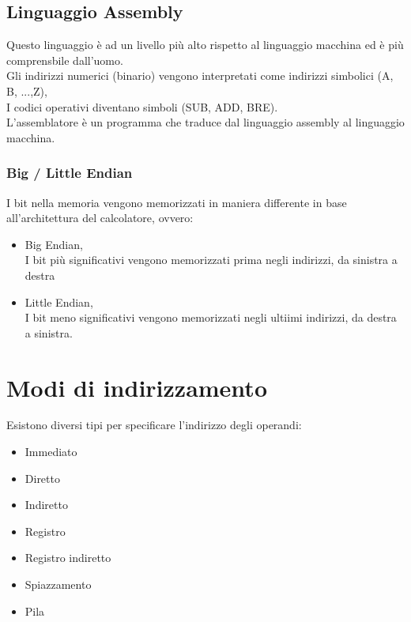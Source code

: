 \documentclass[arch.tex]{subfiles}
\begin{document}
\subsection{Linguaggio Assembly}%
\label{sub:linguaggio_assembly}
Questo linguaggio è ad un livello più alto rispetto al linguaggio macchina ed è più comprensbile dall'uomo.\\
Gli indirizzi numerici (binario) vengono interpretati come indirizzi simbolici (A, B, ...,Z),\\
I codici operativi diventano simboli (SUB, ADD, BRE).\\
L'assemblatore è un programma che traduce dal linguaggio assembly al linguaggio macchina.

\subsubsection{Big / Little Endian}
I bit nella memoria vengono memorizzati in maniera differente in base all'architettura del calcolatore, ovvero:

\begin{itemize}
	\item Big Endian,\\
		I bit più significativi vengono memorizzati prima negli indirizzi, da sinistra a destra
	\item Little Endian,\\
		I bit meno significativi vengono memorizzati negli ultiimi indirizzi, da destra a sinistra.	
\end{itemize}


\section{Modi di indirizzamento}%
\label{sub:modi_di_indirizzamento}

Esistono diversi tipi per specificare l'indirizzo degli operandi:

\begin{itemize}
	\item Immediato
	\item Diretto
	\item Indiretto
	\item Registro
	\item Registro indiretto
	\item Spiazzamento
	\item Pila
\end{itemize}


%
\label{sub:immediato}
\end{document}
